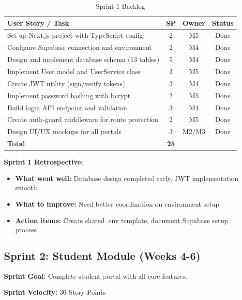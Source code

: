 \documentclass[12pt,a4paper]{article}
\begin{document}
\begin{table}[H]
\centering
\begin{tabularx}{\textwidth}{|X|c|c|c|}
\hline
\textbf{User Story / Task} & \textbf{SP} & \textbf{Owner} & \textbf{Status} \\
\hline
Set up Next.js project with TypeScript config & 2 & M5 & Done \\
\hline
Configure Supabase connection and environment & 2 & M4 & Done \\
\hline
Design and implement database schema (13 tables) & 5 & M4 & Done \\
\hline
Implement User model and UserService class & 3 & M5 & Done \\
\hline
Create JWT utility (sign/verify tokens) & 3 & M4 & Done \\
\hline
Implement password hashing with bcrypt & 2 & M5 & Done \\
\hline
Build login API endpoint and validation & 3 & M4 & Done \\
\hline
Create auth-guard middleware for route protection & 2 & M5 & Done \\
\hline
Design UI/UX mockups for all portals & 3 & M2/M3 & Done \\
\hline
\textbf{Total} & \textbf{25} & & \\
\hline
\end{tabularx}
\caption{Sprint 1 Backlog}
\end{table}

\textbf{Sprint 1 Retrospective:}
\begin{itemize}[noitemsep]
    \item \textbf{What went well:} Database design completed early, JWT implementation smooth
    \item \textbf{What to improve:} Need better coordination on environment setup
    \item \textbf{Action items:} Create shared .env template, document Supabase setup process
\end{itemize}

\subsection{Sprint 2: Student Module (Weeks 4-6)}

\textbf{Sprint Goal:} Complete student portal with all core features.

\textbf{Sprint Velocity:} 30 Story Points
\end{document}
